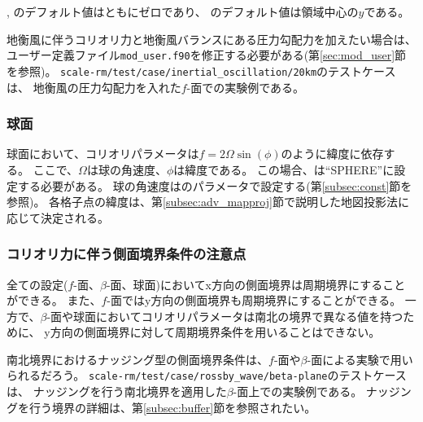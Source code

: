 , のデフォルト値はともにゼロであり、
のデフォルト値は領域中心の$y$である。

地衡風に伴うコリオリ力と地衡風バランスにある圧力勾配力を加えたい場合は、
ユーザー定義ファイル\verb|mod_user.f90|を修正する必要がある(第\ref{sec:mod_user}節を参照)。
\verb|scale-rm/test/case/inertial_oscillation/20km|のテストケースは、
地衡風の圧力勾配力を入れた$f$-面での実験例である。

\subsubsection{球面}
球面において、コリオリパラメータは$f = 2\Omega \sin(\phi)$のように緯度に依存する。
ここで、$\Omega$は球の角速度、$\phi$は緯度である。
この場合、は``SPHERE''に設定する必要がある。
球の角速度はのパラメータで設定する(第\ref{subsec:const}節を参照)。
各格子点の緯度は、第\ref{subsec:adv_mapproj}節で説明した地図投影法に応じて決定される。


\subsubsection{コリオリ力に伴う側面境界条件の注意点}

全ての設定($f$-面、$\beta$-面、球面)においてx方向の側面境界は周期境界にすることができる。
また、$f$-面ではy方向の側面境界も周期境界にすることができる。
一方で、$\beta$-面や球面においてコリオリパラメータは南北の境界で異なる値を持つために、
y方向の側面境界に対して周期境界条件を用いることはできない。

南北境界におけるナッジング型の側面境界条件は、$f$-面や$\beta$-面による実験で用いられるだろう。
\verb|scale-rm/test/case/rossby_wave/beta-plane|のテストケースは、
ナッジングを行う南北境界を適用した$\beta$-面上での実験例である。
ナッジングを行う境界の詳細は、第\ref{subsec:buffer}節を参照されたい。
